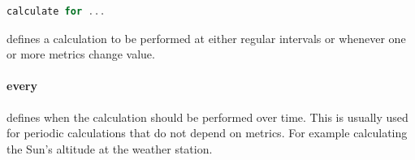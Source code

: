 \label{config:calculateFor}

\begin{lstlisting}[language=Go,style=kaolstplain]
calculate for ...
\end{lstlisting}

 defines a calculation to be performed at either regular intervals or whenever one or more
metrics change value.

\paragraph{every}defines when the calculation should be performed over time.
This is usually used for periodic calculations that do not depend on metrics.
For example calculating the Sun's altitude at the weather station.
